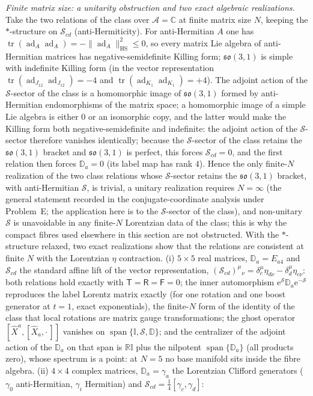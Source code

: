 \emph{Finite matrix size: a unitarity obstruction and two exact algebraic realizations.} Take the two relations of the class over \(\mathcal A=\mathbb C\) at finite matrix size \(N\), keeping the \(*\)-structure on \(\mathcal S_{cd}\) (anti-Hermiticity). For anti-Hermitian \(A\) one has \(\operatorname{tr}(\operatorname{ad}_A\operatorname{ad}_A)=-\lVert\operatorname{ad}_A\rVert_{\mathrm{HS}}^2\le0\), so every matrix Lie algebra of anti-Hermitian matrices has negative-semidefinite Killing form; \(\mathfrak{so}(3,1)\) is simple with indefinite Killing form (in the vector representation \(\operatorname{tr}(\operatorname{ad}_{J_{12}}\operatorname{ad}_{J_{12}})=-4\) and \(\operatorname{tr}(\operatorname{ad}_{K_1}\operatorname{ad}_{K_1})=+4\)). The adjoint action of the \(\mathcal S\)-sector of the class is a homomorphic image of \(\mathfrak{so}(3,1)\) formed by anti-Hermitian endomorphisms of the matrix space; a homomorphic image of a simple Lie algebra is either \(0\) or an isomorphic copy, and the latter would make the Killing form both negative-semidefinite and indefinite: the adjoint action of the \(\mathcal S\)-sector therefore vanishes identically; because the \(\mathcal S\)-sector of the class retains the \(\mathfrak{so}(3,1)\) bracket and \(\mathfrak{so}(3,1)\) is perfect, this forces \(\mathcal S_{cd}=0\), and the first relation then forces \(\mathbb D_a=0\) (its label map has rank \(4\)). Hence the only finite-\(N\) realization of the two class relations whose \(\mathcal S\)-sector retains the \(\mathfrak{so}(3,1)\) bracket, with anti-Hermitian \(\mathcal S\), is trivial, a unitary realization requires \(N=\infty\) (the general statement recorded in the conjugate-coordinate analysis under Problem~E; the application here is to the \(\mathcal S\)-sector of the class), and non-unitary \(\mathcal S\) is unavoidable in any finite-\(N\) Lorentzian data of the class; this is why the compact fibres used elsewhere in this section are not obstructed. With the \(*\)-structure relaxed, two exact realizations show that the relations are consistent at finite \(N\) with the Lorentzian \(\eta\) contraction. (i) \(5\times5\) real matrices, \(\mathbb D_a=E_{a4}\) and \(\mathcal S_{cd}\) the standard affine lift of the vector representation, \((\mathcal S_{cd})^{\mu}{}_{\nu}=\delta^{\mu}_{c}\eta_{d\nu}-\delta^{\mu}_{d}\eta_{c\nu}\): both relations hold exactly with \(\mathsf T=\mathsf R=\mathsf F=0\); the inner automorphism \(\mathrm e^{\mathcal S}\mathbb D_a\mathrm e^{-\mathcal S}\) reproduces the label Lorentz matrix exactly (for one rotation and one boost generator at \(t=1\), exact exponentials), the finite-\(N\) form of the identity of the class that local rotations are matrix gauge transformations; the ghost operator \([\hat X^a,[\hat X_a,\cdot\,]]\) vanishes on \(\operatorname{span}\{\mathbb I,\mathcal S,\mathbb D\}\); and the centralizer of the adjoint action of the \(\mathbb D_a\) on that span is \(\mathbb R\mathbb I\) plus the nilpotent \(\operatorname{span}\{\mathbb D_a\}\) (all products zero), whose spectrum is a point: at \(N=5\) no base manifold sits inside the fibre algebra. (ii) \(4\times4\) complex matrices, \(\mathbb D_a=\gamma_a\) the Lorentzian Clifford generators (\(\gamma_0\) anti-Hermitian, \(\gamma_i\) Hermitian) and \(\mathcal S_{cd}=\tfrac14[\gamma_c,\gamma_d]\): 
